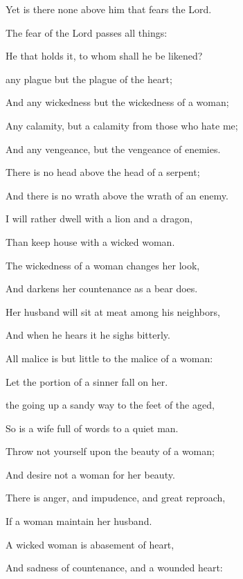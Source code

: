 {\par }{\Q Yet is there none above him that fears the Lord.
\par }{\Q {}The fear of the Lord passes all things:
\par }{\Q He that holds it, to whom shall he be likened?
\par }{\BB \par }{\Q {} any plague but the plague of the heart;
\par }{\Q And any wickedness but the wickedness of a woman;
\par }{\Q {}Any calamity, but a calamity from those who hate me;
\par }{\Q And any vengeance, but the vengeance of enemies.
\par }{\Q {}There is no head above the head of a serpent;
\par }{\Q And there is no wrath above the wrath of an enemy.
\par }{\BB \par }{\Q {}I will rather dwell with a lion and a dragon,
\par }{\Q Than keep house with a wicked woman.
\par }{\Q {}The wickedness of a woman changes her look,
\par }{\Q And darkens her countenance as a bear does.
\par }{\Q {}Her husband will sit at meat among his neighbors,
\par }{\Q And when he hears it he sighs bitterly.
\par }{\Q {}All malice is but little to the malice of a woman:
\par }{\Q Let the portion of a sinner fall on her.
\par }{\Q {} the going up a sandy way
{} to the feet of the aged,
\par }{\Q So is a wife full of words to a quiet man.
\par }{\Q {}Throw not yourself upon the beauty of a woman;
\par }{\Q And desire not a woman for her beauty.
\par }{\Q {}There is anger, and impudence, and great reproach,
\par }{\Q If a woman maintain her husband.
\par }{\Q {}A wicked woman is abasement of heart,
\par }{\Q And sadness of countenance, and a wounded heart:
}
